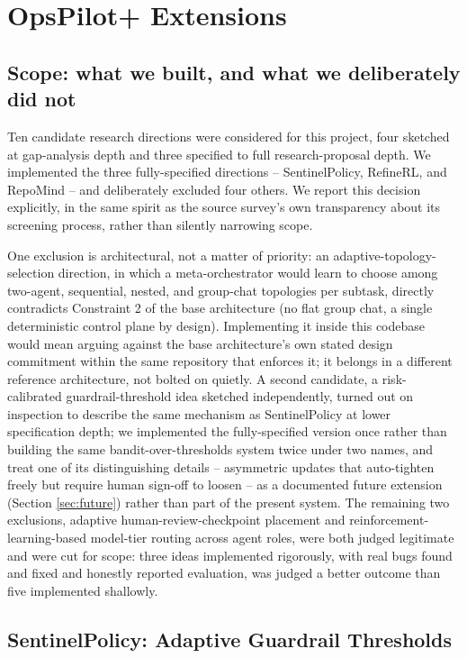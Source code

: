 \documentclass[conference]{IEEEtran}
\begin{document}
\section{OpsPilot+ Extensions}
\label{sec:extensions}

\subsection{Scope: what we built, and what we deliberately did not}
\label{sec:scope}

Ten candidate research directions were considered for this project, four
sketched at gap-analysis depth and three specified to full research-proposal
depth. We implemented the three fully-specified directions --
SentinelPolicy, RefineRL, and RepoMind -- and deliberately excluded four
others. We report this decision explicitly, in the same spirit as the source
survey's own transparency about its screening process, rather than silently
narrowing scope.

One exclusion is architectural, not a matter of priority: an
adaptive-topology-selection direction, in which a meta-orchestrator would
learn to choose among two-agent, sequential, nested, and group-chat
topologies per subtask, directly contradicts Constraint 2 of the base
architecture (no flat group chat, a single deterministic control plane by
design). Implementing it inside this codebase would mean arguing against the
base architecture's own stated design commitment within the same repository
that enforces it; it belongs in a different reference architecture, not
bolted on quietly. A second candidate, a risk-calibrated guardrail-threshold
idea sketched independently, turned out on inspection to describe the same
mechanism as SentinelPolicy at lower specification depth; we implemented the
fully-specified version once rather than building the same bandit-over-thresholds
system twice under two names, and treat one of its distinguishing details --
asymmetric updates that auto-tighten freely but require human sign-off to
loosen -- as a documented future extension (Section \ref{sec:future}) rather
than part of the present system. The remaining two exclusions, adaptive
human-review-checkpoint placement and reinforcement-learning-based model-tier
routing across agent roles, were both judged legitimate and were cut for
scope: three ideas implemented rigorously, with real bugs found and fixed
and honestly reported evaluation, was judged a better outcome than five
implemented shallowly.

\subsection{SentinelPolicy: Adaptive Guardrail Thresholds}
\label{sec:sentinel}
\end{document}

